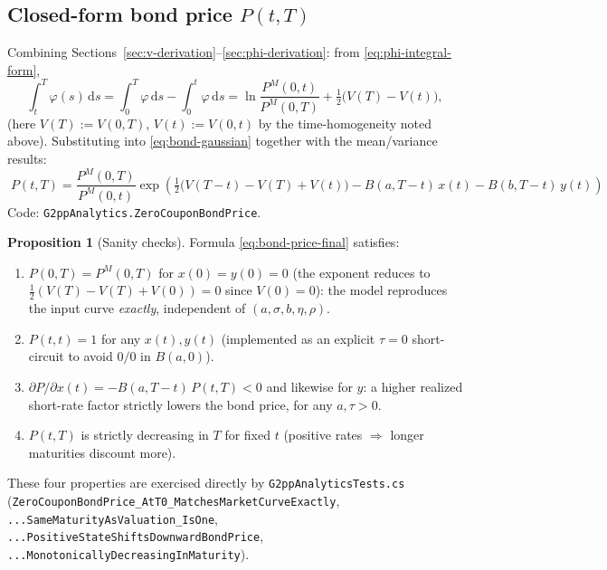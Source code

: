 \documentclass[11pt,a4paper]{article}
\newcommand{\dd}{\mathrm{d}}
\newcommand{\coderef}[1]{\texttt{\color{blue!60!black}#1}}
\theoremstyle{definition}
\newtheorem{prop}{Proposition}[section]
\begin{document}
\subsection{Closed-form bond price $P(t,T)$}
\label{sec:bond-price}

Combining Sections~\ref{sec:v-derivation}--\ref{sec:phi-derivation}: from
\eqref{eq:phi-integral-form},
\[
  \int_t^T\varphi(s)\,\dd s = \int_0^T\varphi\,\dd s - \int_0^t\varphi\,\dd s
  = \ln\frac{P^M(0,t)}{P^M(0,T)} + \tfrac12\bigl(V(T)-V(t)\bigr),
\]
(here $V(T):=V(0,T)$, $V(t):=V(0,t)$ by the time-homogeneity noted above).
Substituting into \eqref{eq:bond-gaussian} together with the mean/variance
results:
\begin{equation}
  \boxed{\;P(t,T) = \frac{P^M(0,T)}{P^M(0,t)}
    \exp\!\left(\tfrac12\bigl(V(T{-}t)-V(T)+V(t)\bigr)
                - B(a,T{-}t)\,x(t) - B(b,T{-}t)\,y(t)\right)\;}
  \label{eq:bond-price-final}
\end{equation}
Code: \coderef{G2ppAnalytics.ZeroCouponBondPrice}.

\begin{prop}[Sanity checks]
Formula \eqref{eq:bond-price-final} satisfies:
\begin{enumerate}[nosep]
  \item $P(0,T)=P^M(0,T)$ for $x(0)=y(0)=0$ (the exponent reduces to
        $\tfrac12(V(T)-V(T)+V(0))=0$ since $V(0)=0$): the model reproduces
        the input curve \emph{exactly}, independent of
        $(a,\sigma,b,\eta,\rho)$.
  \item $P(t,t)=1$ for any $x(t),y(t)$ (implemented as an explicit
        $\tau=0$ short-circuit to avoid $0/0$ in $B(a,0)$).
  \item $\partial P/\partial x(t) = -B(a,T-t)\,P(t,T) < 0$ and likewise for
        $y$: a higher realized short-rate factor strictly lowers the bond
        price, for any $a,\tau>0$.
  \item $P(t,T)$ is strictly decreasing in $T$ for fixed $t$ (positive
        rates $\Rightarrow$ longer maturities discount more).
\end{enumerate}
\end{prop}
These four properties are exercised directly by
\coderef{G2ppAnalyticsTests.cs}
(\texttt{ZeroCouponBondPrice\_\allowbreak AtT0\_\allowbreak MatchesMarketCurveExactly},
\texttt{...SameMaturityAsValuation\_\allowbreak IsOne},
\texttt{...PositiveStateShiftsDownwardBondPrice},
\texttt{...MonotonicallyDecreasingInMaturity}).

\end{document}
